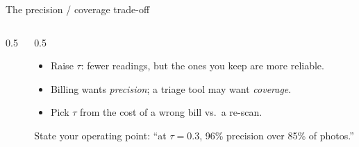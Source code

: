 \documentclass[10pt,aspectratio=169]{beamer}
\begin{document}
\begin{frame}{The precision / coverage trade-off}
  \begin{columns}[T]
    \begin{column}{0.5\textwidth}
    \end{column}
    \begin{column}{0.5\textwidth}
      \begin{itemize}
        \item Raise $\tau$: fewer readings, but the ones you keep are more reliable.
        \item Billing wants \emph{precision}; a triage tool may want \emph{coverage}.
        \item Pick $\tau$ from the cost of a wrong bill vs.\ a re-scan.
      \end{itemize}
      \begin{goodbox}
        State your operating point: ``at $\tau=0.3$, 96\% precision over 85\% of photos.''
      \end{goodbox}
    \end{column}
  \end{columns}
\end{frame}
\end{document}

